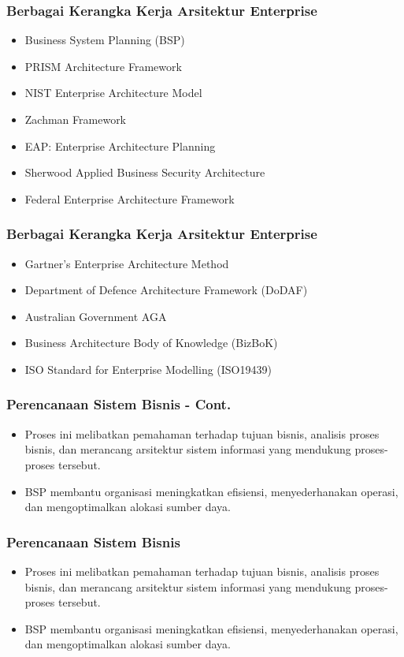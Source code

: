 \documentclass[aspectratio=169, table]{beamer}
\begin{document}
	
	\begin{frame}
		\frametitle{Berbagai Kerangka Kerja Arsitektur Enterprise}
		\begin{itemize}
			\item Business System Planning (BSP)
			\item PRISM Architecture Framework
			\item NIST Enterprise Architecture Model
			\item Zachman Framework
			\item EAP: Enterprise Architecture Planning
			\item Sherwood Applied Business Security Architecture
			\item Federal Enterprise Architecture Framework

		\end{itemize}
		
	\end{frame}
		\begin{frame}
		\frametitle{Berbagai Kerangka Kerja Arsitektur Enterprise}
		\begin{itemize}
			\item Gartner’s Enterprise Architecture Method
			\item Department of Defence Architecture Framework (DoDAF)
			\item Australian Government AGA
			\item Business Architecture Body of Knowledge (BizBoK)
			\item ISO Standard for Enterprise Modelling (ISO19439)
		\end{itemize}
	\end{frame}
	
	\begin{frame}
		\frametitle{Perencanaan Sistem Bisnis - Cont.}
		\begin{itemize}
			\item Proses ini melibatkan pemahaman terhadap tujuan bisnis, analisis proses bisnis, dan merancang arsitektur sistem informasi yang mendukung proses-proses tersebut.
			\item BSP membantu organisasi meningkatkan efisiensi, menyederhanakan operasi, dan mengoptimalkan alokasi sumber daya.
		\end{itemize}
	\end{frame}
	
	
	\begin{frame}
		\frametitle{Perencanaan Sistem Bisnis}
		\begin{itemize}
			\item Proses ini melibatkan pemahaman terhadap tujuan bisnis, analisis proses bisnis, dan merancang arsitektur sistem informasi yang mendukung proses-proses tersebut.
			\item BSP membantu organisasi meningkatkan efisiensi, menyederhanakan operasi, dan mengoptimalkan alokasi sumber daya.
		\end{itemize}
	\end{frame}
	
\end{document}
